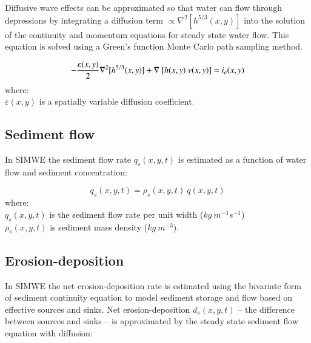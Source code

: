 \documentclass[final,3p,times,twocolumn]{elsarticle}
\begin{document}
Diffusive wave effects can be approximated
so that water can flow through depressions 
by integrating a diffusion term $ \propto \nabla^2 [h^{5/3}(x,y)]$ 
into the solution of the continuity and momentum equations 
for steady state water flow.
This equation is solved using a 
Green's function Monte Carlo path sampling method. 

\begin{equation}
\label{eq:difwater}
-{\varepsilon(x,y)\over 2 }\nabla^2 [h^{5/3}(x,y)]
+\nabla ~ [ h(x,y)~v(x,y)] = i_e(x,y)
\end{equation}
%
{\small
\noindent
 where: \\
 \noindent
 \hspace*{0.5em} $\varepsilon(x,y)$ is a spatially variable diffusion coefficient. \\
}

\subsection{Sediment flow}
In SIMWE the sediment flow rate $q_s(x,y,t)$ is estimated 
as a function of water flow and sediment concentration:

\begin{equation}\label{eq:sedflow} 
q_s(x,y,t) = \rho_s(x,y,t) ~ q(x,y,t)
\end{equation}
%
{\small
\noindent
where: \\
\hspace*{0.5em} $q_s(x,y,t)$ is the sediment flow rate per unit width ($kg~m^{-1}s^{-1}$)\\
\hspace*{0.5em} $\rho_s(x,y,t)$ is sediment mass density ($kg~m^{-3}$).\\
}

\subsection{Erosion-deposition}
In SIMWE 
the net erosion-deposition rate is estimated
using the bivariate form of sediment continuity equation
to model sediment storage and flow 
based on effective sources and sinks.
Net erosion-deposition $d_s(x,y,t)$
-- the difference between sources and sinks --
is approximated by
the steady state sediment flow equation with diffusion:
\end{document}
